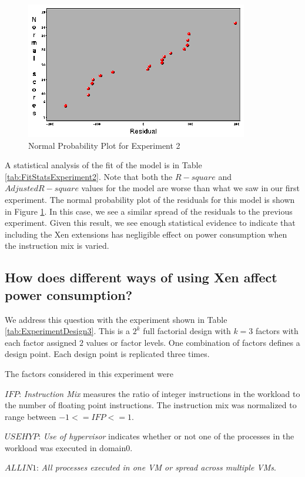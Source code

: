 \documentclass[preprint]{sigplanconf}
\begin{document}
\begin{figure}
  \centering
  \begin{center}
    \includegraphics[scale=1.5]{graphics/normalresiduals2.eps}
  \end{center}
  \caption{Normal Probability Plot for Experiment 2}
  \label{fig:Residuals2}
\end{figure}
A statistical analysis of the fit of the model is in Table
\ref{tab:FitStatsExperiment2}.  Note that both the $R-square$ and $Adjusted
R-square$ values for the model are worse than what we saw in our first
experiment.  The normal probability plot of the residuals for this model is
shown in Figure \ref{fig:Residuals2}.  In this case, we see a similar spread
of the residuals to the previous experiment.  Given this result, we see enough
statistical evidence to indicate that including the Xen extensions has
negligible effect on power consumption when the instruction mix is varied.

\subsection{How does different ways of using Xen affect power consumption?}
\label{sec:XenUse}
\label{Experiment3}
We address this question with the experiment shown in Table
\ref{tab:ExperimentDesign3}.  This is a $2^{k}$ full factorial design with
$k=3$ factors with each factor assigned $2$ values or factor levels.  One
combination of factors defines a design point.  Each design point is
replicated three times.

The factors considered in this experiment were 
\begin{list}{}{}
\item $IFP$: \emph{Instruction Mix} measures the ratio of integer instructions in the
  workload to the number of floating point instructions.  The instruction mix
  was normalized to range between $-1<=IFP<=1$.
\item $USEHYP$: \emph{Use of hypervisor} indicates whether or not one of the
  processes in the workload was executed in domain0.
\item $ALLIN1$: \emph{All processes executed in one VM or spread across multiple VMs}.
\end{list}
\end{document}
